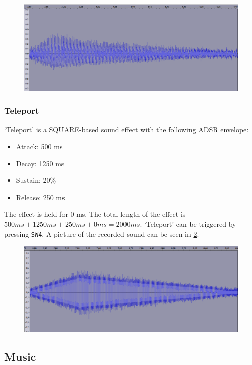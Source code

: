 \begin{figure}[H]
	\includegraphics[width = \textwidth]{images/SW5.png}
	\caption{}
	\label{img-sw5}
\end{figure}

\subsubsection{Teleport}
`Teleport' is a SQUARE-based sound effect with the following ADSR envelope:
\begin{itemize}
	\item{Attack: 500 ms}
	\item{Decay: 1250 ms}
	\item{Sustain: 20\%}
	\item{Release: 250 ms}
\end{itemize}
The effect is held for 0 ms.
The total length of the effect is $500 ms + 1250 ms + 250 ms + 0 ms = 2000 ms$.
`Teleport' can be triggered by pressing \texttt{SW4}.
A picture of the recorded sound can be seen in \ref{img-sw4}.

\begin{figure}[H]
	\includegraphics[width = \textwidth]{images/SW4.png}
	\caption{}
	\label{img-sw4}
\end{figure}


\subsection{Music}

